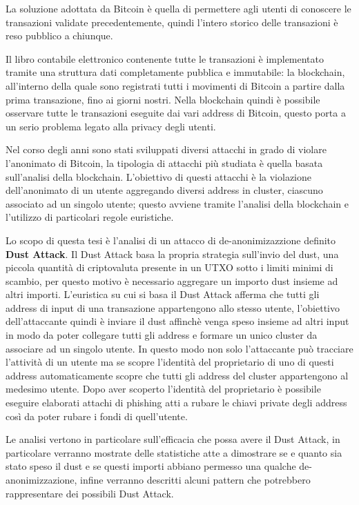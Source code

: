 La soluzione adottata da Bitcoin è quella di permettere agli utenti di conoscere le transazioni validate precedentemente, quindi l'intero storico delle transazioni è reso pubblico a chiunque.

Il libro contabile elettronico contenente tutte le transazioni è implementato tramite una struttura dati completamente pubblica e immutabile: la blockchain, all’interno della quale sono registrati tutti i movimenti di Bitcoin a partire dalla prima transazione, fino ai giorni nostri. Nella blockchain quindi è possibile osservare tutte le transazioni eseguite dai vari address di Bitcoin, questo porta a un serio problema legato alla privacy degli utenti. 

Nel corso degli anni sono stati sviluppati diversi attacchi in grado di violare l'anonimato di Bitcoin, la tipologia di attacchi più studiata è quella basata sull'analisi della blockchain. L'obiettivo di questi attacchi è la violazione dell'anonimato di un utente aggregando diversi address in cluster, ciascuno associato ad un singolo utente; questo avviene tramite l'analisi della blockchain e l'utilizzo di particolari regole euristiche.

Lo scopo di questa tesi è l'analisi di un attacco di de-anonimizazzione definito \textbf{Dust Attack}. Il Dust Attack basa la propria strategia sull'invio del dust, una piccola quantità di criptovaluta presente in un UTXO sotto i limiti minimi di scambio, per questo motivo è necessario aggregare un importo dust insieme ad altri importi. L'euristica su cui si basa il Dust Attack afferma che tutti gli address di input di una transazione appartengono allo stesso utente, l'obiettivo dell'attaccante quindi è inviare il dust affinchè venga speso insieme ad altri input in modo da poter collegare tutti gli address e formare un unico cluster da associare ad un singolo utente. In questo modo non solo l'attaccante può tracciare l'attività di un utente ma se scopre l'identità del proprietario di uno di questi address automaticamente scopre che tutti gli address del cluster appartengono al medesimo utente. Dopo aver scoperto l'identità del proprietario è possibile eseguire elaborati attachi di phishing atti a rubare le chiavi private degli address così da poter rubare i fondi di quell'utente.

Le analisi vertono in particolare sull'efficacia che possa avere il Dust Attack, in particolare verranno mostrate delle statistiche atte a dimostrare se e quanto sia stato speso il dust e se questi importi abbiano permesso una qualche de-anonimizzazione, infine verranno descritti alcuni pattern che potrebbero rappresentare dei possibili Dust Attack.

